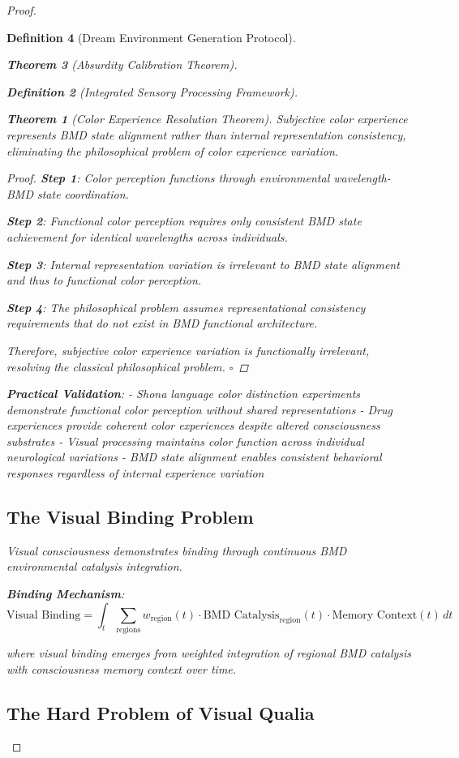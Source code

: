\documentclass[12pt,a4paper]{article}
\newtheorem{theorem}{Theorem}[section]
\newtheorem{definition}[theorem]{Definition}
\begin{document}
\begin{proof}
\begin{definition}[Dream Environment Generation Protocol]
\begin{theorem}[Absurdity Calibration Theorem]
\begin{observation}
\begin{definition}[Integrated Sensory Processing Framework]
\begin{theorem}[Color Experience Resolution Theorem]
Subjective color experience represents BMD state alignment rather than internal representation consistency, eliminating the philosophical problem of color experience variation.
\end{theorem}

\begin{proof}
\textbf{Step 1}: Color perception functions through environmental wavelength-BMD state coordination.

\textbf{Step 2}: Functional color perception requires only consistent BMD state achievement for identical wavelengths across individuals.

\textbf{Step 3}: Internal representation variation is irrelevant to BMD state alignment and thus to functional color perception.

\textbf{Step 4}: The philosophical problem assumes representational consistency requirements that do not exist in BMD functional architecture.

Therefore, subjective color experience variation is functionally irrelevant, resolving the classical philosophical problem. $\square$
\end{proof}

\textbf{Practical Validation}:
- Shona language color distinction experiments demonstrate functional color perception without shared representations
- Drug experiences provide coherent color experiences despite altered consciousness substrates
- Visual processing maintains color function across individual neurological variations
- BMD state alignment enables consistent behavioral responses regardless of internal experience variation

\subsection{The Visual Binding Problem}

Visual consciousness demonstrates binding through continuous BMD environmental catalysis integration.

\textbf{Binding Mechanism}:
$$\text{Visual Binding} = \int_t \sum_{\text{regions}} w_{\text{region}}(t) \cdot \text{BMD Catalysis}_{\text{region}}(t) \cdot \text{Memory Context}(t) \, dt$$

where visual binding emerges from weighted integration of regional BMD catalysis with consciousness memory context over time.

\subsection{The Hard Problem of Visual Qualia}


\end{definition}
\end{observation}
\end{theorem}
\end{definition}
\end{proof}
\end{document}
